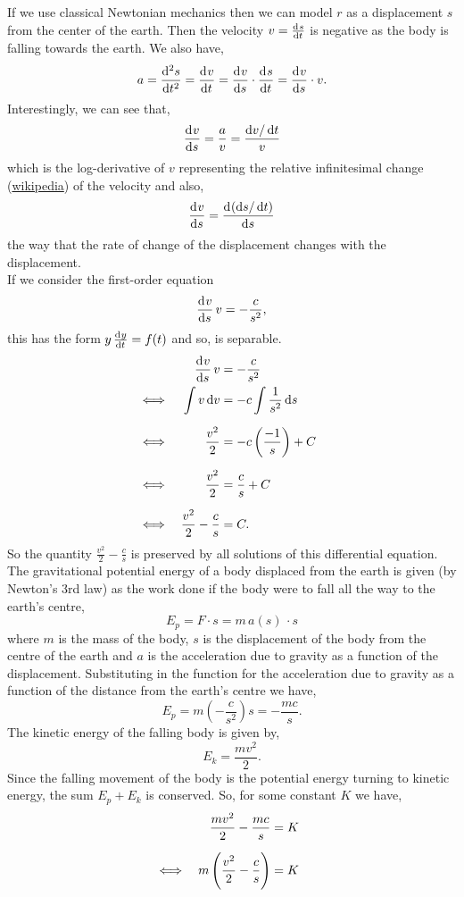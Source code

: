 \documentclass[../MathsNotesBase.tex]{subfiles}
\begin{document}
{\begin{exe}
{				If we use classical Newtonian mechanics then we can model $r$ as a displacement $s$ from the center of the earth. Then the velocity ${ v = \tod{s}{t} }$ is negative as the body is falling towards the earth. We also have,
				\[ a = \dod[2]{s}{t} = \dod{v}{t} = \dod{v}{s} \cdot \dod{s}{t} = \dod{v}{s} \cdot v. \]
				Interestingly, we can see that,
				\[ \dod{v}{s} = \frac{a}{v} = \frac{\dif v/\dif t}{v} \]
				which is the log-derivative of $v$ representing the relative infinitesimal change (\href{https://en.wikipedia.org/wiki/Logarithmic_derivative}{wikipedia}) of the velocity and also,
				\[ \dod{v}{s} = \dod{(\dif s/\dif t)}{s} \]
				the way that the rate of change of the displacement changes with the displacement.\\
				
				If we consider the first-order equation
				\[ \dod{v}{s} v = -\frac{c}{s^2}, \]
				this has the form ${ y \tod{y}{t} = f(t) }$ and so, is separable. 
				\begin{align*}
					&& \dod{v}{s} v &= -\frac{c}{s^2} \\
					&\iff & \int v \dif v &= -c \int \frac{1}{s^2} \dif s &\sidecomment{} \nn
					&\iff & \frac{v^2}{2} &= -c \left(\frac{-1}{s}\right) + C &\sidecomment{} \nn
					&\iff & \frac{v^2}{2} &= \frac{c}{s} + C &\sidecomment{} \nn
					&\iff & \frac{v^2}{2} - \frac{c}{s} &= C.
				\end{align*}
				So the quantity ${ \frac{v^2}{2} - \frac{c}{s} }$ is preserved by all solutions of this differential equation. The gravitational potential energy of a body displaced from the earth is given (by Newton's 3rd law) as the work done if the body were to fall all the way to the earth's centre,
				\[ E_p = F \cdot s = m\, a(s)\, \cdot s \]
				where $m$ is the mass of the body, $s$ is the displacement of the body from the centre of the earth and $a$ is the acceleration due to gravity as a function of the displacement. Substituting in the function for the acceleration due to gravity as a function of the distance from the earth's centre we have,
				\[ E_p = m \left(-\frac{c}{s^2}\right) s = - \frac{mc}{s}. \]
				The kinetic energy of the falling body is given by,
				\[ E_k = \frac{mv^2}{2}. \]
				Since the falling movement of the body is the potential energy turning to kinetic energy, the sum ${ E_p + E_k }$ is conserved. So, for some constant $K$ we have,
				\begin{align*}
					&& \frac{mv^2}{2} - \frac{mc}{s} &= K \nn
					&\iff & m \left( \frac{v^2}{2} - \frac{c}{s} \right) &= K &\sidecomment{} \nn

\end{align*}}
\end{exe}}
\end{document}
